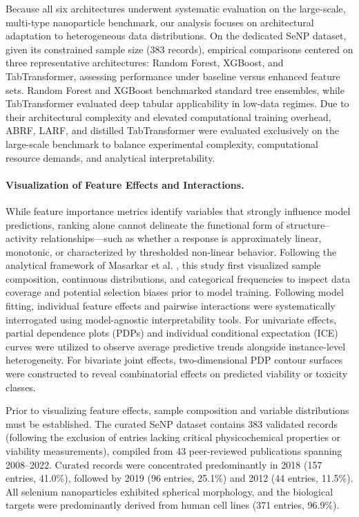 Because all six architectures underwent systematic evaluation on the large-scale, multi-type nanoparticle benchmark, our analysis focuses on architectural adaptation to heterogeneous data distributions.
On the dedicated SeNP dataset, given its constrained sample size (383 records), empirical comparisons centered on three representative architectures: Random Forest, XGBoost, and TabTransformer, assessing performance under baseline versus enhanced feature sets. Random Forest and XGBoost benchmarked standard tree ensembles, while TabTransformer evaluated deep tabular applicability in low-data regimes.
Due to their architectural complexity and elevated computational training overhead, ABRF, LARF, and distilled TabTransformer were evaluated exclusively on the large-scale benchmark to balance experimental complexity, computational resource demands, and analytical interpretability.

\paragraph{Visualization of Feature Effects and Interactions.}
While feature importance metrics identify variables that strongly influence model predictions, ranking alone cannot delineate the functional form of structure--activity relationships—such as whether a response is approximately linear, monotonic, or characterized by thresholded non-linear behavior. Following the analytical framework of Masarkar et al. \cite{masarkar2024}, this study first visualized sample composition, continuous distributions, and categorical frequencies to inspect data coverage and potential selection biases prior to model training. Following model fitting, individual feature effects and pairwise interactions were systematically interrogated using model-agnostic interpretability tools. For univariate effects, partial dependence plots (PDPs) and individual conditional expectation (ICE) curves were utilized to observe average predictive trends alongside instance-level heterogeneity. For bivariate joint effects, two-dimensional PDP contour surfaces were constructed to reveal combinatorial effects on predicted viability or toxicity classes.

Prior to visualizing feature effects, sample composition and variable distributions must be established. The curated SeNP dataset contains 383 validated records (following the exclusion of entries lacking critical physicochemical properties or viability measurements), compiled from 43 peer-reviewed publications spanning 2008--2022. Curated records were concentrated predominantly in 2018 (157 entries, 41.0\%), followed by 2019 (96 entries, 25.1\%) and 2012 (44 entries, 11.5\%). All selenium nanoparticles exhibited spherical morphology, and the biological targets were predominantly derived from human cell lines (371 entries, 96.9\%).

